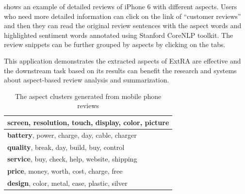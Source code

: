  shows an example of detailed reviews of iPhone 6 with different aspects.
Users who need more detailed information can click on the link of ``customer reviews'' and then they can read the original review sentences with the aspect words and highlighted sentiment words annotated using Stanford CoreNLP toolkit\cite{manning-EtAl:2014:P14-5}. 
The review snippets can be further grouped by aspects by clicking on the tabs.

This application demonstrates the extracted aspects of ExtRA are effective and the downstream task based on its results can benefit the research and systems about aspect-based review analysis and summarization.
\begin{table}[t]
	\normalsize
	\centering
	\caption{The aspect clusters generated from mobile phone reviews}
	\label{table:clusters}
	\begin{tabular}{|l|}
		\hline
		\textbf{screen}, resolution, touch, display, color, picture \\ \hline
		\textbf{battery}, power, charge, day, cable, charger \\ \hline
		\textbf{quality}, break, day, build, buy, control \\ \hline
		\textbf{service}, buy, check, help, website, shipping \\ \hline
		\textbf{price}, money, worth, cost, charge, free \\ \hline
		\textbf{design}, color, metal, case, plastic, silver \\ \hline
	\end{tabular}
\end{table}




%

